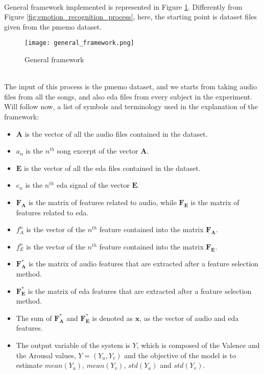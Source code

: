 \\
General framework implemented is represented in Figure \ref{fig:general_framework}. Differently from Figure \ref{fig:emotion_recognition_process}, here, the starting point is dataset files given from the \gls{pmemo} dataset.
\begin{figure}[h]
    \centering
    \texttt{[image: general\_framework.png]} 
	\caption{General framework}
    \label{fig:general_framework}
\end{figure}
\\
The input of this process is the \gls{pmemo} dataset, and we starts from taking audio files from all the songs, and also \gls{eda} files from every subject in the experiment.
\\
Will follow now, a list of symbols and terminology used in the explanation of the framework:
\begin{itemize}
	\item $\textbf{A}$ is the vector of all the audio files contained in the dataset.
	\item $a_n$ is the $n^{th}$ song excerpt of the vector $\textbf{A}$.
	\item $\textbf{E}$ is the vector of all the \gls{eda} files contained in the dataset.
	\item $e_n$ is the $n^{th}$ \gls{eda} signal of the vector $\textbf{E}$.
	\item $\textbf{F}_\textbf{A}$ is the matrix of features related to audio, while $\textbf{F}_\textbf{E}$ is the matrix of features related to \gls{eda}.
	\item $f_A^n$ is the vector of the $n^{th}$ feature contained into the matrix $\textbf{F}_\textbf{A}$.
	\item $f_E^n$ is the vector of the $n^{th}$ feature contained into the matrix $\textbf{F}_\textbf{E}$.
	\item $\textbf{F}_\textbf{A}^*$ is the matrix of audio features that are extracted after a feature selection method.
	\item $\textbf{F}_\textbf{E}^*$ is the matrix of \gls{eda} features that are extracted after a feature selection method.
	\item The sum of $\textbf{F}_\textbf{A}^*$ and $\textbf{F}_\textbf{E}^*$ is denoted as $\textbf{x}$, as the vector of audio and \gls{eda} features.
	\item The output variable of the system is $Y$, which is composed of the Valence and the Arousal values, $Y=(Y_a,Y_v)$ and the objective of the model is to estimate $mean(Y_a)$, $mean(Y_v)$, $std(Y_a)$ and $std(Y_v)$.
\end{itemize}
